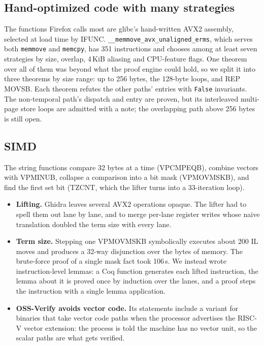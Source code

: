 \documentclass[11pt]{article}
\newcommand{\code}[1]{\texttt{#1}}
\begin{document}
\subsection{Hand-optimized code with many strategies}

The functions Firefox calls most are glibc's hand-written AVX2 assembly,
selected at load time by IFUNC.  \code{\_\_memmove\_avx\_unaligned\_erms},
which serves both \code{memmove} and \code{memcpy}, has 351 instructions and
chooses among at least seven strategies by size, overlap, 4\,KiB aliasing
and CPU-feature flags.  One theorem over all of them was beyond what the
proof engine could hold, so we split it into three theorems by size range:
up to 256 bytes, the 128-byte loops, and REP MOVSB.  Each theorem refutes
the other paths' entries with \code{False} invariants.  The non-temporal path's dispatch and entry are proven, but its
interleaved multi-page store loops are admitted with a note; the
overlapping path above 256 bytes is still open.

\subsection{SIMD}

The string functions compare 32 bytes at a time (VPCMPEQB), combine vectors
with VPMINUB, collapse a comparison into a bit mask (VPMOVMSKB), and find the
first set bit (TZCNT, which the lifter turns into a 33-iteration loop).
\begin{itemize}
\item \textbf{Lifting.}  Ghidra leaves several AVX2 operations opaque.  The
      lifter had to spell them out lane by lane, and to merge per-lane
      register writes whose naive translation doubled the term size with every
      lane.
\item \textbf{Term size.}  Stepping one VPMOVMSKB symbolically executes
      about 200 IL moves and produces a 32-way disjunction over the bytes of
      memory.  The brute-force proof of a single mask fact took 106\,s.
      We instead wrote instruction-level lemmas: a Coq function generates
      each lifted instruction, the lemma about it is proved once by induction
      over the lanes, and a proof steps the instruction with a single lemma
      application.
\item \textbf{OSS-Verify avoids vector code.}  Its statements include a
      variant for binaries that take vector code paths when the processor
      advertises the RISC-V vector extension: the process is told the
      machine has no vector unit, so the scalar paths are what gets verified.
\end{itemize}
\end{document}
